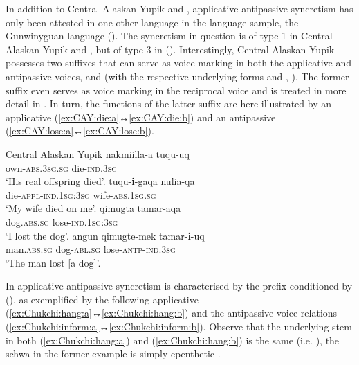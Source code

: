 In addition to Central Alaskan Yupik and , applicative-antipassive syncretism has only been attested in one other language in the language sample, the Gunwinyguan language  (). The syncretism in question is of type 1 in Central Alaskan Yupik and , but of type 3 in  (). Interestingly, Central Alaskan Yupik possesses two suffixes that can serve as voice marking in both the applicative and antipassive voices,  and  (with the respective underlying forms  and , \citealt[830ff.]{miyaoka:2012}). The former suffix even serves as voice marking in the reciprocal voice and is treated in more detail in . In turn, the functions of the latter suffix are here illustrated by an applicative  (\ref{ex:CAY:die:a}↔\ref{ex:CAY:die:b}) and an antipassive  (\ref{ex:CAY:lose:a}↔\ref{ex:CAY:lose:b}).

\ea Central Alaskan Yupik \citep[396, 517, 836]{miyaoka:2012}
\ea\label{ex:CAY:die:a}
	\gll	nakmiilla-a tuqu-uq \\
			own-\textsc{abs.3sg.sg} die-\textsc{ind.3sg} \\
	\glt	‘His real offspring died’.
	\newpage
\ex\label{ex:CAY:die:b}
	\gll	tuqu-\textbf{i}-gaqa nulia-qa \\
			die-\textsc{appl-ind.1sg:3sg} wife-\textsc{abs.1sg.sg} \\
	\glt	‘My wife died on me’.
\ex\label{ex:CAY:lose:a}
	\gll	qimugta tamar-aqa \\
			dog.\textsc{abs.sg} lose-\textsc{ind.1sg:3sg} \\
	\glt	‘I lost the dog’.
\ex\label{ex:CAY:lose:b}
	\gll	angun {\ob}qimugte-mek{\cb} tamar-\textbf{i}-uq \\
			man.\textsc{abs.sg} {\db}dog-\textsc{abl.sg} lose-\textsc{antp-ind.3sg} \\
	\glt	‘The man lost [a dog]’.
	\z 
\z

In  applicative-antipassive syncretism is characterised by the prefix  conditioned by  (\citealt[48]{dunn:1999}), as exemplified by the following applicative (\ref{ex:Chukchi:hang:a}↔\ref{ex:Chukchi:hang:b}) and the antipassive voice relations (\ref{ex:Chukchi:inform:a}↔\ref{ex:Chukchi:inform:b}). Observe that the underlying stem in both (\ref{ex:Chukchi:hang:a}) and (\ref{ex:Chukchi:hang:b}) is the same (i.e. ), the schwa in the former example is simply epenthetic \citep[39ff.]{dunn:1999}. 

